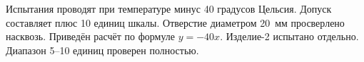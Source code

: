 Испытания проводят при температуре минус 40 градусов Цельсия.
Допуск составляет плюс 10 единиц шкалы.
Отверстие диаметром 20~мм просверлено насквозь.
Приведён расчёт по формуле $y = -40 x$.
Изделие-2 испытано отдельно.
Диапазон 5--10 единиц проверен полностью.
